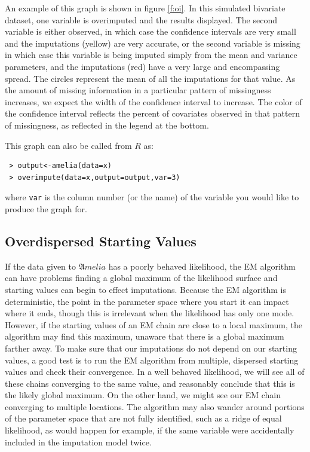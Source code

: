 \documentclass[12pt,titlepage]{article}
\newcommand{\Amelia}{\ensuremath{\mathfrak Amelia} }
\begin{document}
An example of this graph is shown in figure \ref{f:oi}.  In this
simulated bivariate dataset, one variable is overimputed and the
results displayed.  The second variable is either observed, in which
case the confidence intervals are very small and the imputations
(yellow) are very accurate, or the second variable is missing in which
case this variable is being imputed simply from the mean and variance
parameters, and the imputations (red) have a very large and
encompassing spread.  The circles represent the mean of all the
imputations for that value.  As the amount of missing information in a
particular pattern of missingness increases, we expect the width of
the confidence interval to increase.  The color of the confidence
interval reflects the percent of covariates observed in that pattern
of missingness, as reflected in the legend at the bottom.

This graph can also be called from $R$ as:
\begin{verbatim}
 > output<-amelia(data=x) 
 > overimpute(data=x,output=output,var=3)
\end{verbatim}
where \texttt{var} is the column number (or the name) of the variable
you would like to produce the graph for.


\subsection{Overdispersed Starting Values}
\label{sec:overdisperse}

If the data given to \Amelia has a poorly behaved likelihood, the EM
algorithm can have problems finding a global maximum of the likelihood
surface and starting values can begin to effect imputations.  Because
the EM algorithm is deterministic, the point in the parameter space
where you start it can impact where it ends, though this is irrelevant
when the likelihood has only one mode.  However, if the starting
values of an EM chain are close to a local maximum, the algorithm may
find this maximum, unaware that there is a global maximum farther
away.  To make sure that our imputations do not depend on our starting
values, a good test is to run the EM algorithm from multiple,
dispersed starting values and check their convergence.  In a well
behaved likelihood, we will see all of these chains converging to the
same value, and reasonably conclude that this is the likely global
maximum.  On the other hand, we might see our EM chain converging to
multiple locations.  The algorithm may also wander around portions of
the parameter space that are not fully identified, such as a ridge of
equal likelihood, as would happen for example, if the same variable
were accidentally included in the imputation model twice.
\end{document}
